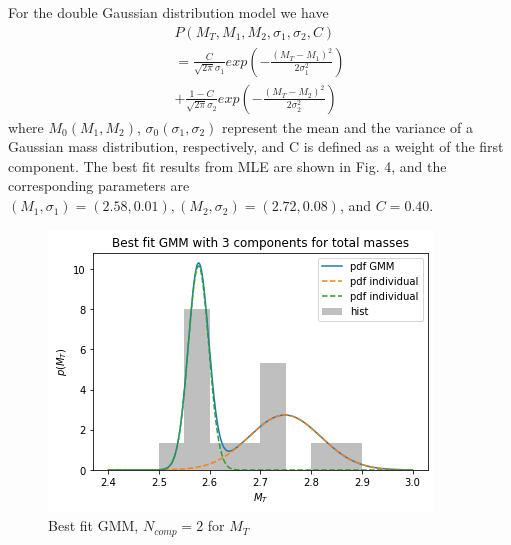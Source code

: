 \documentclass[journal,12pt,twocolumn]{IEEEtran}
\begin{document}
For the double Gaussian distribution model we have
\begin{multline}
P\left(M_{T}, M_{1}, M_{2}, \sigma_{1}, \sigma_{2}, C\right)\\ = \frac{C}{\sqrt{2\pi}\sigma_{1}}exp\left(-\frac{(M_T-M_1)^2}{2\sigma_{1}^2}\right)\\ + \frac{1-C}{\sqrt{2\pi}\sigma_{2}}exp\left(-\frac{(M_T-M_2)^2}{2\sigma_{2}^2}\right) 
\end{multline}
where $M_0(M_1, M_2)$, $\sigma_0(\sigma_1, \sigma_2)$ represent the mean and the variance of a Gaussian mass distribution, respectively, and C is defined as a weight of the first component. The best fit results from MLE are shown in Fig. 4, and the corresponding parameters are $(M_1 , \sigma_1) = (2.58, 0.01), (M_2 , \sigma_2) = (2.72, 0.08)$, and $C = 0.40$.
\begin{figure}[ht!]
\centering
\includegraphics[scale=0.6]{fig/gmm2.png}
\caption{Best fit GMM, $N_{comp}=2$ for $M_T$}
\end{figure}
\end{document}
